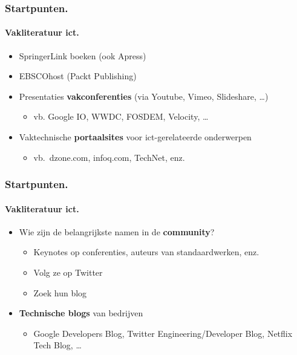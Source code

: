 \documentclass[aspectratio=169]{beamer}
\begin{document}
\begin{frame}
  \frametitle{Startpunten.}
  \framesubtitle{Vakliteratuur ict.}

  \begin{itemize}
    \item SpringerLink boeken (ook Apress)
    \item EBSCOhost (Packt Publishing)
    \item Presentaties \textbf{vakconferenties} (via Youtube, Vimeo, Slideshare, \dots)
          \begin{itemize}
            \item vb. Google IO, WWDC, FOSDEM, Velocity, \dots
          \end{itemize}
    \item<+-> Vaktechnische \textbf{portaalsites} voor ict-gerelateerde onderwerpen
      \begin{itemize}
        \item vb.~dzone.com, infoq.com, TechNet, enz.
      \end{itemize}
  \end{itemize}
\end{frame}

\begin{frame}
  \frametitle{Startpunten.}
  \framesubtitle{Vakliteratuur ict.}

  \begin{itemize}
    \item<+-> Wie zijn de belangrijkste namen in de \textbf{community}?
      \begin{itemize}
        \item Keynotes op conferenties, auteurs van standaardwerken, enz.
        \item Volg ze op Twitter
        \item Zoek hun blog
      \end{itemize}
    \item<+-> \textbf{Technische blogs} van bedrijven
      \begin{itemize}
        \item Google Developers Blog, Twitter Engineering/Developer Blog, Netflix Tech Blog, \dots
      \end{itemize}
  \end{itemize}
\end{frame}
\end{document}
